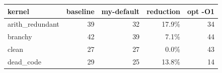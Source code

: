 \begin{tabular}{lrrrr}
\toprule
kernel & baseline & my-default & reduction & opt -O1 \\
\midrule
arith\_redundant & 39 & 32 & 17.9\% & 34 \\
branchy & 42 & 39 & 7.1\% & 44 \\
clean & 27 & 27 & 0.0\% & 43 \\
dead\_code & 29 & 25 & 13.8\% & 14 \\
\bottomrule
\end{tabular}
